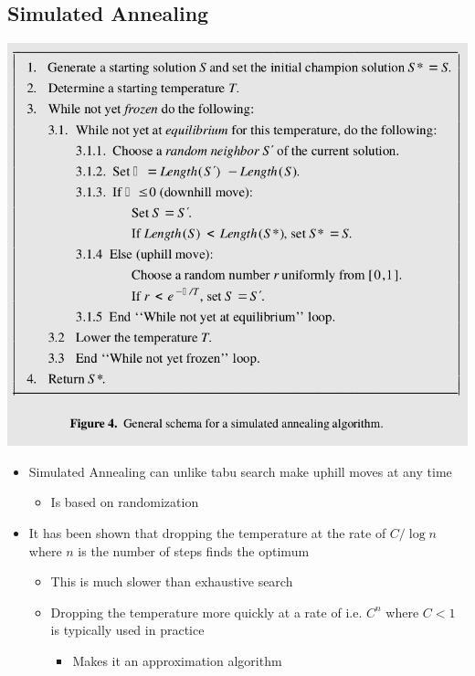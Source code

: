 \documentclass[11pt]{article}
\begin{document}
\subsection{Simulated Annealing}
\label{sec:orgbad2a33}
\begin{center}
\includegraphics[width=.9\linewidth]{TSP Problem (local optimization)/screenshot_2019-05-14_08-32-46.png}
\end{center}

\begin{itemize}
\item Simulated Annealing can unlike tabu search make uphill moves at any time
\begin{itemize}
\item Is based on randomization
\end{itemize}

\item It has been shown that dropping the temperature at the rate of \(C / \log n\) where \(n\) is the number of steps finds the optimum
\begin{itemize}
\item This is much slower than exhaustive search
\item Dropping the temperature more quickly at a rate of i.e. \(C^n\) where \(C < 1\) is typically used in practice
\begin{itemize}
\item Makes it an approximation algorithm
\end{itemize}
\end{itemize}
\end{itemize}
\end{document}
